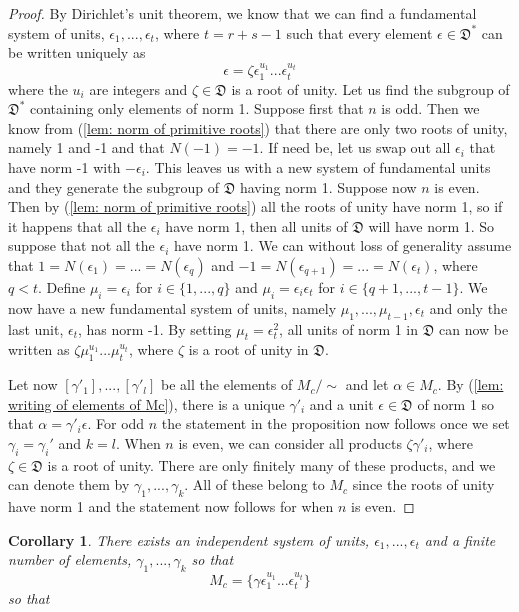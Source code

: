 \documentclass{article}
\newtheorem{corollary}{Corollary}[section]
\newcommand{\mfrak}[1]{\mathfrak{#1}}
\begin{document}
\begin{proof}
    By Dirichlet's unit theorem, we know that we can find a fundamental system of units, $\epsilon_1, ..., \epsilon_t$, where $t = r+s-1$ such that every element $\epsilon \in \mfrak D^*$ can be written uniquely as 
    $$\epsilon = \zeta \epsilon_1^{u_1} ... \epsilon_t^{u_t}$$
    where the $u_i$ are integers and $\zeta \in \mfrak D$ is a root of unity. Let us find the subgroup of $\mfrak D^*$ containing only elements of norm 1. Suppose first that $n$ is odd. Then we know from (\ref{lem: norm of primitive roots}) that there are only two roots of unity, namely 1 and -1 and that $N(-1) = -1$. If need be, let us swap out all $\epsilon_i$ that have norm -1 with $-\epsilon_i$. This leaves us with a new system of fundamental units and they generate the subgroup of $\mfrak D$ having norm 1. Suppose now $n$ is even. Then by (\ref{lem: norm of primitive roots}) all the roots of unity have norm 1, so if it happens that all the $\epsilon_i$ have norm 1, then all units of $\mfrak D$ will have norm 1. So suppose that not all the $\epsilon_i$ have norm 1. We can without loss of generality assume that $1 = N(\epsilon_1) = ... = N(\epsilon_q)$ and $-1 = N(\epsilon_{q+1}) = ... = N(\epsilon_t)$, where $q < t$. Define  
    $\mu_i = \epsilon_i$ for $i \in \{1, ..., q\}$ and $\mu_i = \epsilon_i \epsilon_t$ for $i \in \{q+1, ..., t-1\}$. We now have a new fundamental system of units, namely $\mu_1, ..., \mu_{t-1},\epsilon_t$ and only the last unit, $\epsilon_t$, has norm -1. By setting $\mu_t = \epsilon_t^2$, all units of norm 1 in $\mfrak D$ can now be written as $\zeta \mu_1^{u_1}...\mu_t^{u_t}$, where $\zeta$ is a root of unity in $\mfrak D$. 

    Let now $[\gamma'_1], ..., [\gamma'_l]$ be all the elements of $M_c / \sim$ and let $\alpha \in M_c$. By (\ref{lem: writing of elements of Mc}), there is a unique $\gamma'_i$ and a unit $\epsilon \in \mfrak D$ of norm 1 so that $\alpha = \gamma'_i \epsilon$. For odd $n$ the statement in the proposition now follows once we set $\gamma_i = \gamma_i'$ and $k = l$. When $n$ is even, we can consider all products $\zeta \gamma'_i$, where $\zeta \in \mfrak D$ is a root of unity. There are only finitely many of these products, and we can denote them by $\gamma_1, ..., \gamma_k$. All of these belong to $M_c$ since the roots of unity have norm 1 and the statement now follows for when $n$ is even.
\end{proof}

\begin{corollary}
    There exists an independent system of units, $\epsilon_1, ..., \epsilon_t$ and a finite number of elements, $\gamma_1, ..., \gamma_k$ so that 
    $$M_c = \{ \gamma \epsilon_1^{u_1}...\epsilon_t^{u_t}\}$$
    so that
\end{corollary}
\end{document}
